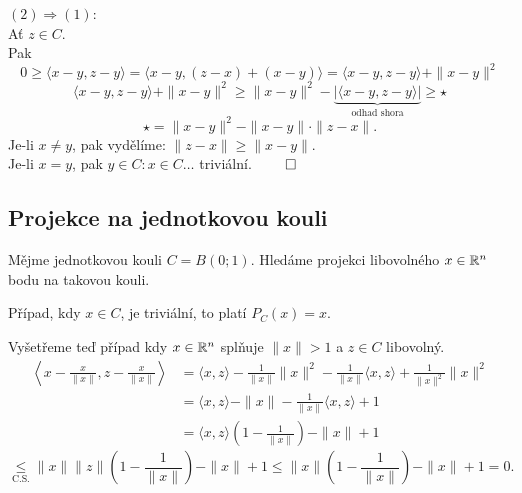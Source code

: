 $(2) \Rightarrow (1)$:\\
Ať $z \in C$.\\
Pak
\[
    0 \geq \langle x-y, z-y \rangle = \langle x-y, (z-x)+(x-y) \rangle = \langle x-y, z-y \rangle + \|x-y\|^2  
\]
\[
    \langle x-y, z-y \rangle + \|x-y\|^2 \geq  \|x-y\|^2 - \underbrace{|\langle x-y, z-y\rangle|}_{\text{odhad shora}} \geq \star
\]
\[
    \star = \|x-y\|^2 - \|x-y\| \cdot \|z-x\|.
\]
Je-li $x \not= y$, pak vydělíme: $\|z-x\| \geq \|x-y\|$.\\
Je-li $x=y$, pak $y \in C : x \in C \dots$ triviální. $\qed$ 

\subsection{Projekce na jednotkovou kouli}
Mějme jednotkovou kouli $C = B(0; 1)$. Hledáme projekci libovolného $x \in \mathbb{R}^n$ bodu na takovou kouli.

Případ, kdy $x \in C$, je triviální, to platí $P_C(x) = x$.

\begin{wrapfigure}{r}{0.3\textwidth}
\end{wrapfigure}
Vyšetřeme teď případ kdy $x \in \mathbb{R}^n$ splňuje $\| x\| > 1$ a $z \in C$ libovolný.
\begin{align*}
    \left\langle x - \frac{x}{\|x\|}, z - \frac{x}{\|x\|}\right\rangle &= 
    \langle x, z\rangle - \frac{1}{\|x\|}\|x\|^2 - \frac{1}{\|x\|}\langle x,z\rangle + \frac{1}{\|x\|^2}\|x\|^2 \\
    &= \langle x, z\rangle - \|x\| - \frac{1}{\|x\|}\langle x,z\rangle + 1 \\
    &= \langle x, z\rangle (1-\frac{1}{\|x\|}) - \|x\| + 1
\end{align*}
\[
    \underset{\text{C.S.}}{\leq} \|x\|\|z\|\left(1-\frac{1}{\|x\|}\right) - \|x\| + 
    1 \leq \|x\|\left(1-\frac{1}{\|x\|}\right) - \|x\| + 1 = 0.
\]

